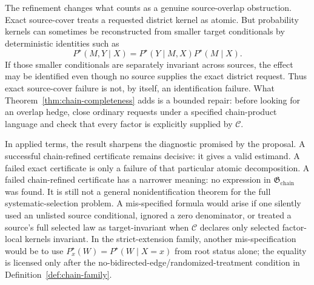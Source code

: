 \documentclass[11pt]{article}
\theoremstyle{definition}
\theoremstyle{plain}
\theoremstyle{remark}
\begin{document}
The refinement changes what counts as a genuine source-overlap obstruction.
Exact source-cover treats a requested district kernel as atomic.  But
probability kernels can sometimes be reconstructed from smaller target
conditionals by deterministic identities such as
\[
  P^\star(M,Y\mid X)=P^\star(Y\mid M,X)P^\star(M\mid X).
\]
If those smaller conditionals are separately invariant across sources, the
effect may be identified even though no source supplies the exact district
request.  Thus exact source-cover failure is not, by itself, an
identification failure.  What Theorem~\ref{thm:chain-completeness} adds is a
bounded repair: before looking for an overlap hedge, close ordinary requests
under a specified chain-product language and check that every factor is
explicitly supplied by \(\mathcal C\).

In applied terms, the result sharpens the diagnostic promised by the proposal.
A successful chain-refined certificate remains decisive: it gives a valid
estimand.  A failed exact certificate is only a failure of that particular
atomic decomposition.  A failed chain-refined certificate has a narrower
meaning: no expression in \(\mathfrak G_{\mathrm{chain}}\) was found.  It is
still not a general nonidentification theorem for the full
systematic-selection problem.  A mis-specified formula would arise if one
silently used an unlisted source conditional, ignored a zero denominator, or
treated a source's full selected law as target-invariant when \(\mathcal C\)
declares only selected factor-local kernels invariant.  In the
strict-extension family, another mis-specification would be to use
\(P^\star_x(W)=P^\star(W\mid X=x)\) from root status alone; the equality is
licensed only after the no-bidirected-edge/randomized-treatment condition in
Definition~\ref{def:chain-family}.
\end{document}
